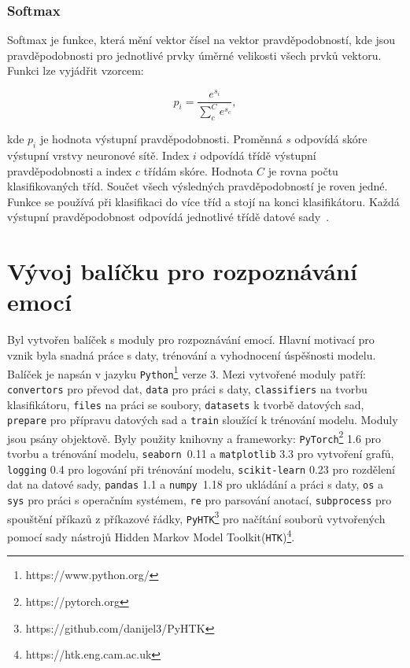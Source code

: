 \documentclass[FM,BP]{tulthesis}
\begin{document}
\subsection{Softmax} %
Softmax je funkce, která mění vektor čísel na vektor pravděpodobností, kde jsou pravděpodobnosti pro jednotlivé prvky úměrné velikosti všech prvků vektoru. Funkci lze vyjádřit vzorcem:

\begin{equation}
\label{eqn:softmax}
p_i = \frac{e^{s_i}}{\sum_{c}^{C}e^{s_c}},
\end{equation}

kde $ p_i $ je hodnota výstupní pravděpodobnosti. Proměnná $ s $ odpovídá skóre výstupní vrstvy neuronové sítě. Index $ i $ odpovídá třídě výstupní pravděpodobnosti a index $ c $ třídám skóre. Hodnota $ C $ je rovna počtu klasifikovaných tříd. Součet všech výsledných pravděpodobností je roven jedné. Funkce se používá při klasifikaci do více tříd a stojí na konci klasifikátoru. Každá výstupní pravděpodobnost odpovídá jednotlivé třídě datové sady~\cite{brownlee_2020_Softmax}.

\chapter{Vývoj balíčku pro rozpoznávání emocí} %
Byl vytvořen balíček s moduly pro rozpoznávání emocí. Hlavní motivací pro vznik byla snadná práce s daty, trénování a vyhodnocení úspěšnosti modelu. Balíček je napsán v jazyku \texttt{\mbox{Python}}\footnote{https://www.python.org/} verze 3. Mezi vytvořené moduly patří: \texttt{\mbox{convertors}} pro převod dat, \texttt{\mbox{data}} pro práci s daty, \texttt{\mbox{classifiers}} na tvorbu klasifikátoru, \texttt{\mbox{files}} na práci se soubory, \texttt{\mbox{datasets}} k tvorbě datových sad, \texttt{\mbox{prepare}} pro přípravu datových sad a \texttt{\mbox{train}} sloužící k trénování modelu. Moduly jsou psány objektově. Byly použity knihovny a frameworky: \texttt{\mbox{PyTorch}}\footnote{https://pytorch.org} 1.6 pro tvorbu a trénování modelu, \texttt{\mbox{seaborn}}~0.11 a \texttt{\mbox{matplotlib}} 3.3 pro vytvoření grafů, \texttt{\mbox{logging}} 0.4 pro logování při trénování modelu, \texttt{\mbox{scikit-learn}} 0.23 pro rozdělení dat na datové sady, \texttt{\mbox{pandas}} 1.1 a \texttt{\mbox{numpy}}~1.18 pro ukládání a práci s daty, \texttt{\mbox{os}} a \texttt{\mbox{sys}} pro práci s operačním systémem, \texttt{\mbox{re}} pro parsování anotací, \texttt{\mbox{subprocess}} pro spouštění příkazů z příkazové řádky, \texttt{\mbox{PyHTK}}\footnote{https://github.com/danijel3/PyHTK} pro načítání souborů vytvořených pomocí sady nástrojů Hidden Markov Model Toolkit(\texttt{\mbox{HTK}})\footnote{https://htk.eng.cam.ac.uk}.
\end{document}
